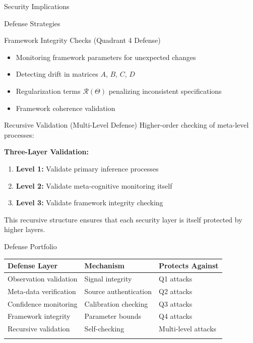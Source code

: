 \documentclass[
  ignorenonframetext,
]{beamer}
\newcounter{none} %
\providecommand{\tightlist}{%
  \setlength{\itemsep}{0pt}\setlength{\parskip}{0pt}}
\begin{document}
\begin{frame}{Security Implications}
\begin{block}{Defense Strategies}
\begin{block}{Framework Integrity Checks (Quadrant 4 Defense)}
\begin{itemize}
\tightlist
\item
  Monitoring framework parameters for unexpected changes
\item
  Detecting drift in matrices \(A\), \(B\), \(C\), \(D\)
\item
  Regularization terms \(\mathcal{R}(\Theta)\) penalizing inconsistent
  specifications
\item
  Framework coherence validation
\end{itemize}
\end{block}

\begin{block}{Recursive Validation (Multi-Level Defense)}
\protect{}\label{recursive-validation-multi-level-defense}
Higher-order checking of meta-level processes:

\textbf{Three-Layer Validation:}

\begin{enumerate}
\tightlist
\item
  \textbf{Level 1:} Validate primary inference processes
\item
  \textbf{Level 2:} Validate meta-cognitive monitoring itself
\item
  \textbf{Level 3:} Validate framework integrity checking
\end{enumerate}

This recursive structure ensures that each security layer is itself
protected by higher layers.
\end{block}

\begin{block}{Defense Portfolio}
\protect{}\label{defense-portfolio}
{\def\LTcaptype{none} %
\begin{longtable}[]{@{}lll@{}}
\toprule\noalign{}
Defense Layer & Mechanism & Protects Against \\
\midrule\noalign{}
\endhead
Observation validation & Signal integrity & Q1 attacks \\
Meta-data verification & Source authentication & Q2 attacks \\
Confidence monitoring & Calibration checking & Q3 attacks \\
Framework integrity & Parameter bounds & Q4 attacks \\
Recursive validation & Self-checking & Multi-level attacks \\
\bottomrule\noalign{}
\end{longtable}
}
\end{block}
\end{block}


\end{frame}
\end{document}

